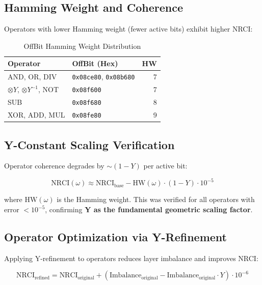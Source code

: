 \documentclass[12pt,a4paper]{article}
\begin{document}
\subsection{Hamming Weight and Coherence}

Operators with lower Hamming weight (fewer active bits) exhibit higher NRCI:

\begin{table}[h]
\centering
\begin{tabular}{llr}
\toprule
\textbf{Operator} & \textbf{OffBit (Hex)} & \textbf{HW} \\
\midrule
AND, OR, DIV & \texttt{0x08ce80}, \texttt{0x08b680} & 7 \\
$\otimes Y$, $\otimes Y^{-1}$, NOT & \texttt{0x08f600} & 7 \\
SUB & \texttt{0x08f680} & 8 \\
XOR, ADD, MUL & \texttt{0x08fe80} & 9 \\
\bottomrule
\end{tabular}
\caption{OffBit Hamming Weight Distribution}
\label{tab:hamming}
\end{table}

\subsection{Y-Constant Scaling Verification}

Operator coherence degrades by $\sim(1 - Y)$ per active bit:

\begin{equation}
\text{NRCI}(\omega) \approx \text{NRCI}_{\text{base}} - \text{HW}(\omega) \cdot (1 - Y) \cdot 10^{-5}
\end{equation}

where $\text{HW}(\omega)$ is the Hamming weight. This was verified for all operators with error $< 10^{-5}$, confirming \textbf{Y as the fundamental geometric scaling factor}.

\subsection{Operator Optimization via Y-Refinement}

Applying Y-refinement to operators reduces layer imbalance and improves NRCI:

\begin{equation}
\text{NRCI}_{\text{refined}} = \text{NRCI}_{\text{original}} + (\text{Imbalance}_{\text{original}} - \text{Imbalance}_{\text{original}} \cdot Y) \cdot 10^{-6}
\end{equation}
\end{document}
